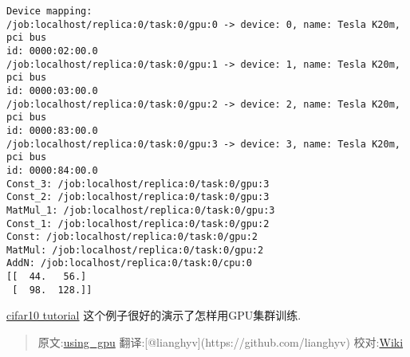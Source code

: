 \begin{verbatim}
Device mapping:
/job:localhost/replica:0/task:0/gpu:0 -> device: 0, name: Tesla K20m, pci bus
id: 0000:02:00.0
/job:localhost/replica:0/task:0/gpu:1 -> device: 1, name: Tesla K20m, pci bus
id: 0000:03:00.0
/job:localhost/replica:0/task:0/gpu:2 -> device: 2, name: Tesla K20m, pci bus
id: 0000:83:00.0
/job:localhost/replica:0/task:0/gpu:3 -> device: 3, name: Tesla K20m, pci bus
id: 0000:84:00.0
Const_3: /job:localhost/replica:0/task:0/gpu:3
Const_2: /job:localhost/replica:0/task:0/gpu:3
MatMul_1: /job:localhost/replica:0/task:0/gpu:3
Const_1: /job:localhost/replica:0/task:0/gpu:2
Const: /job:localhost/replica:0/task:0/gpu:2
MatMul: /job:localhost/replica:0/task:0/gpu:2
AddN: /job:localhost/replica:0/task:0/cpu:0
[[  44.   56.]
 [  98.  128.]]
\end{verbatim}

\href{tensorflow-zh/SOURCE/tutorials/deep_cnn/index.md}{cifar10
tutorial} 这个例子很好的演示了怎样用GPU集群训练.

\begin{quote}
原文:\href{http://tensorflow.org/how_tos/using_gpu/index.md}{using\_gpu}
翻译:{[}@lianghyv{]}(https://github.com/lianghyv)
校对:\href{https://github.com/jikexueyuanwiki}{Wiki}
\end{quote}

